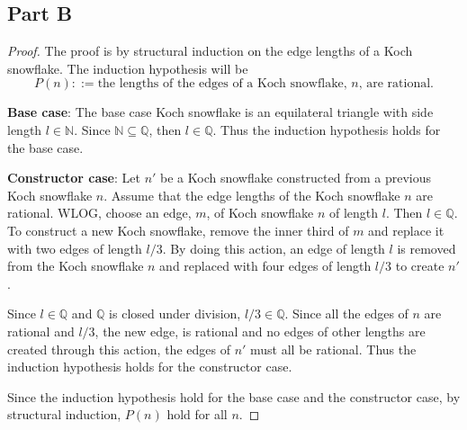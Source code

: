 \documentclass{article}
\begin{document}
\subsection*{Part B}

\begin{proof}
  The proof is by structural induction on the edge lengths of a Koch snowflake.
  The induction hypothesis will be
  $$ P(n) ::= \textrm{the lengths of the edges of a Koch snowflake, } n
  \textrm{, are rational.} $$

  \noindent
  \textbf{Base case}: The base case Koch snowflake is an equilateral triangle
  with side length $l \in \mathbb{N}$. Since $\mathbb{N} \subseteq \mathbb{Q}$,
  then $l \in \mathbb{Q}$. Thus the induction hypothesis holds for the base
  case.

  \bigbreak

  \noindent
  \textbf{Constructor case}: Let $n'$ be a Koch snowflake constructed from a
  previous Koch snowflake $n$. Assume that the edge lengths of the Koch
  snowflake $n$ are rational. WLOG, choose an edge, $m$, of Koch snowflake $n$
  of length $l$. Then $l \in \mathbb{Q}$. To construct a new Koch snowflake,
  remove the inner third of $m$ and replace it with two edges of length $l/3$.
  By doing this action, an edge of length $l$ is removed from the Koch snowflake
  $n$ and replaced with four edges of length $l/3$ to create $n'$.

  Since $l \in \mathbb{Q}$ and $\mathbb{Q}$ is closed under division, $l/3 \in
  \mathbb{Q}$. Since all the edges of $n$ are rational and $l/3$, the new edge,
  is rational and no edges of other lengths are created through this action, the
  edges of $n'$ must all be rational. Thus the induction hypothesis holds for
  the constructor case.

  \bigbreak

  Since the induction hypothesis hold for the base case and the constructor
  case, by structural induction, $P(n)$ hold for all $n$.
\end{proof}

\bigbreak
\bigbreak
\bigbreak
\bigbreak
\bigbreak
\bigbreak
\bigbreak
\bigbreak
\bigbreak
\bigbreak
\bigbreak
\bigbreak
\bigbreak
\bigbreak
\bigbreak
\bigbreak
\bigbreak
\bigbreak
\bigbreak
\end{document}

